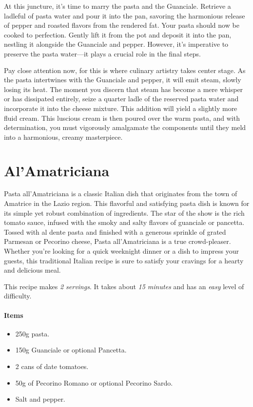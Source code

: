 At this juncture, it's time to marry the pasta and the Guanciale. Retrieve a ladleful of pasta water and pour it into the pan, savoring the harmonious release of pepper and roasted flavors from the rendered fat. Your pasta should now be cooked to perfection. Gently lift it from the pot and deposit it into the pan, nestling it alongside the Guanciale and pepper. However, it's imperative to preserve the pasta water—it plays a crucial role in the final steps.

Pay close attention now, for this is where culinary artistry takes center stage. As the pasta intertwines with the Guanciale and pepper, it will emit steam, slowly losing its heat. The moment you discern that steam has become a mere whisper or has dissipated entirely, seize a quarter ladle of the reserved pasta water and incorporate it into the cheese mixture. This addition will yield a slightly more fluid cream. This luscious cream is then poured over the warm pasta, and with determination, you must vigorously amalgamate the components until they meld into a harmonious, creamy masterpiece.
\clearpage

\section{Al'Amatriciana}
\label{alamatriciana}
Pasta all'Amatriciana is a classic Italian dish that originates from the town of Amatrice in the Lazio region. This flavorful and satisfying pasta dish is known for its simple yet robust combination of ingredients. The star of the show is the rich tomato sauce, infused with the smoky and salty flavors of guanciale or pancetta. Tossed with al dente pasta and finished with a generous sprinkle of grated Parmesan or Pecorino cheese, Pasta all'Amatriciana is a true crowd-pleaser. Whether you're looking for a quick weeknight dinner or a dish to impress your guests, this traditional Italian recipe is sure to satisfy your cravings for a hearty and delicious meal.

This recipe makes \emph{2 servings}. It takes about \emph{15 minutes} and has an \emph{easy} level of difficulty. 

\paragraph{Items}
\begin{itemize}[noitemsep]
    \item[\ding{182}] 250g pasta.
    \item[\ding{183}] 150g Guanciale or optional Pancetta.
    \item[\ding{184}] 2 cans of date tomatoes.
    \item[\ding{185}] 50g of Pecorino Romano or optional Pecorino Sardo.
    \item[\ding{186}] Salt and pepper.
\end{itemize}


